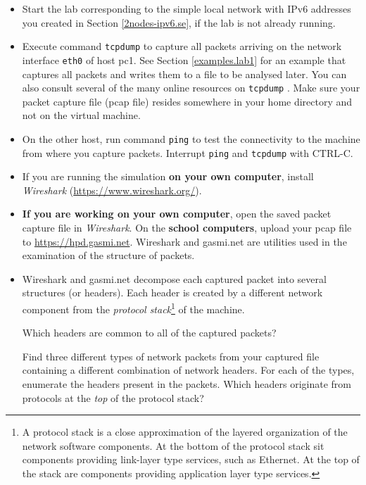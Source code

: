 \documentclass[12pt]{book}
\begin{document}
\begin{itemize}[label=--]
\item Start the lab corresponding to the simple local network with
  IPv6 addresses you
  created in Section \ref{2nodes-ipv6.se}, if the lab is not already running. 
\item Execute command \verb$tcpdump$ to capture all packets arriving
  on the network interface \verb$eth0$ of host pc1. See Section
  \ref{examples.lab1} for an example that captures all packets and
  writes them to a file to be analysed later. You can also consult
  several of the many online resources on \verb$tcpdump$
  \cite{tcpdump,tcpdump2}. Make sure your packet capture file (pcap
  file) resides somewhere in your home directory and not on the
  virtual machine.
\item On the other host, run command \verb$ping$ to test the
  connectivity to the machine from where you capture
  packets. Interrupt \verb$ping$ and \verb$tcpdump$ with CTRL-C.
\item If you are running the simulation \textbf{on your own computer}, install
  \emph{Wireshark} (\url{https://www.wireshark.org/}). 
\item \textbf{If you are working on your own computer}, open the saved
  packet capture file in \emph{Wireshark}. On the \textbf{school
    computers}, upload your pcap file to
  \url{https://hpd.gasmi.net}. Wireshark and gasmi.net are utilities
  used in the examination of the structure of packets.
\item Wireshark and gasmi.net decompose each captured packet into
  several structures (or headers). Each header is created by a
  different network component from the \emph{protocol
    stack}\footnote{A protocol stack is a close approximation of the
    layered organization of the network software components. At the
    bottom of the protocol stack sit components providing link-layer
    type services, such as Ethernet. At the top of the stack are
    components providing application layer type services.} of the
  machine. 

  Which headers are common to all of the captured packets?

  Find three different types of network packets from your captured
  file containing a different combination of network headers. For each
  of the types, enumerate the headers present in the packets. Which
  headers originate from protocols at the \emph{top} of the protocol
  stack?  
\end{itemize}
\end{document}
